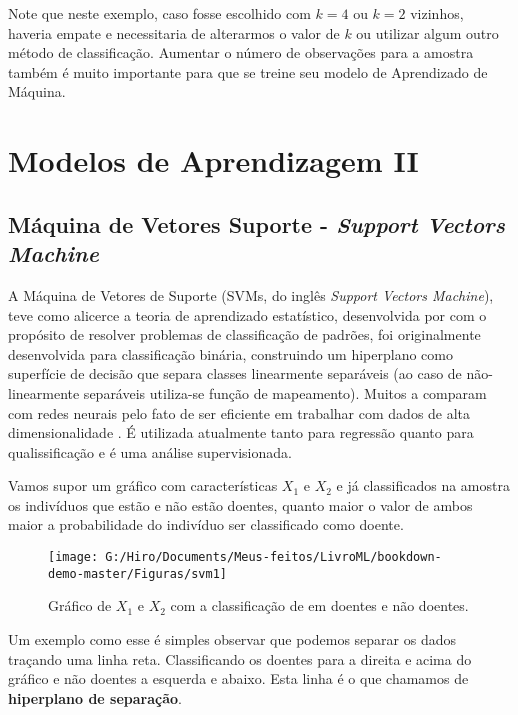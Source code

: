 \documentclass[
  openany]{book}
\begin{document}
Note que neste exemplo, caso fosse escolhido com \(k=4\) ou \(k=2\) vizinhos, haveria empate e necessitaria de alterarmos o valor de \(k\) ou utilizar algum outro método de classificação. Aumentar o número de observações para a amostra também é muito importante para que se treine seu modelo de Aprendizado de Máquina.

\hypertarget{ptII}{%
\chapter{Modelos de Aprendizagem II}\label{ptII}}

\hypertarget{svm}{%
\section{\texorpdfstring{Máquina de Vetores Suporte - \emph{Support Vectors Machine}}{Máquina de Vetores Suporte - Support Vectors Machine}}\label{svm}}

A Máquina de Vetores de Suporte (SVMs, do inglês \emph{Support Vectors Machine}), teve como alicerce a teoria de aprendizado estatístico, desenvolvida por \citet{vapnik2013nature} com o propósito de resolver problemas de classificação de padrões, foi originalmente desenvolvida para classificação binária, construindo um hiperplano como superfície de decisão que separa classes linearmente separáveis (ao caso de não-linearmente separáveis utiliza-se função de mapeamento). Muitos a comparam com redes neurais pelo fato de ser eficiente em trabalhar com dados de alta dimensionalidade \citep{sung2003identifying, ding2001multi}. É utilizada atualmente tanto para regressão quanto para qualissificação e é uma análise supervisionada.

Vamos supor um gráfico com características \(X_1\) e \(X_2\) e já classificados na amostra os indivíduos que estão e não estão doentes, quanto maior o valor de ambos maior a probabilidade do indivíduo ser classificado como doente.

\begin{figure}

{\centering \texttt{[image: G:/Hiro/Documents/Meus-feitos/LivroML/bookdown-demo-master/Figuras/svm1]} 

}

\caption{Gráfico de \(X_1\) e \(X_2\) com a classificação de em doentes e não doentes.}\label{fig:svm1}
\end{figure}



Um exemplo como esse é simples observar que podemos separar os dados traçando uma linha reta. Classificando os doentes para a direita e acima do gráfico e não doentes a esquerda e abaixo. Esta linha é o que chamamos de \textbf{hiperplano de separação}.
\end{document}
